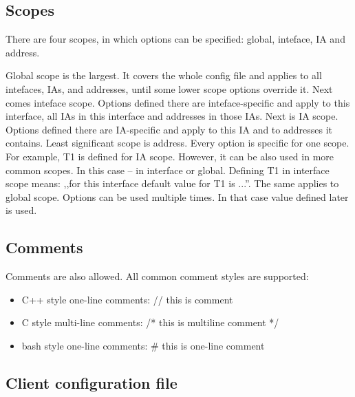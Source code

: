 
\subsection{Scopes}
There are four scopes, in which options can be specified: global,
inteface, IA and address.

Global scope is the largest. It covers the whole config file and
applies to all intefaces, IAs, and addresses, until some lower scope
options override it. Next comes inteface scope. Options defined there
are inteface-specific and apply to this interface, all IAs in this
interface and addresses in those IAs. Next is IA scope. Options
defined there are IA-specific and apply to this IA and to addresses it
contains. Least significant scope is address. Every option is specific
for one scope. For example, T1 is defined for
IA scope. However, it can be also used in more common scopes. In this
case -- in interface or global. Defining T1 in interface scope means:
,,for this interface default value for T1 is ...''. The same applies
to global scope. Options can be used multiple times. In that case
value defined later is used.

\subsection{Comments}

Comments are also allowed. All common comment styles are supported:
\begin{itemize}
\item C++ style one-line comments: // this is comment
\item C style multi-line comments: /* this is multiline comment */
\item bash style one-line comments: \# this is one-line comment
\end{itemize}

\subsection{Client configuration file}

